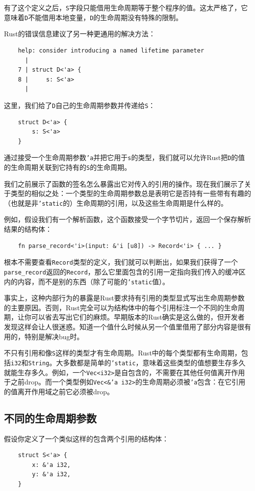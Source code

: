 有了这个定义之后，\texttt{S}字段只能借用生命周期等于整个程序的值。这太严格了，它意味着\texttt{D}不能借用本地变量，\texttt{D}的生命周期没有特殊的限制。

Rust的错误信息建议了另一种更通用的解决方法：
\begin{verbatim}
    help: consider introducing a named lifetime parameter
      |
    7 | struct D<'a> {
    8 |     s: S<'a>
      |
\end{verbatim}

这里，我们给了\texttt{D}自己的生命周期参数并传递给\texttt{S}：
\begin{verbatim}
    struct D<'a> {
        s: S<'a>
    }
\end{verbatim}

通过接受一个生命周期参数\texttt{'a}并把它用于\texttt{s}的类型，我们就可以允许Rust把\texttt{D}的值的生命周期关联到它持有的\texttt{S}的生命周期。

我们之前展示了函数的签名怎么暴露出它对传入的引用的操作。现在我们展示了关于类型的相似之处：一个类型的生命周期参数总是表明它是否持有一些带有有趣的（也就是非\texttt{'static}的）生命周期的引用，以及这些生命周期是什么样的。

例如，假设我们有一个解析函数，这个函数接受一个字节切片，返回一个保存解析结果的结构体：
\begin{verbatim}
    fn parse_record<'i>(input: &'i [u8]) -> Record<'i> { ... }
\end{verbatim}

根本不需要查看\texttt{Record}类型的定义，我们就可以判断出，如果我们获得了一个\\
\texttt{parse\_record}返回的\texttt{Record}，那么它里面包含的引用一定指向我们传入的缓冲区内的内容，而不是别的东西（除了可能的\texttt{'static}值）。

事实上，这种内部行为的暴露是Rust要求持有引用的类型显式写出生命周期参数的主要原因。否则，Rust完全可以为结构体中的每个引用标注一个不同的生命周期，让你可以省去写出它们的麻烦。早期版本的Rust确实是这么做的，但开发者发现这样会让人很迷惑。知道一个值什么时候从另一个值里借用了部分内容是很有用的，特别是解决bug时。

不只有引用和像\texttt{S}这样的类型才有生命周期。Rust中的每个类型都有生命周期，包括\texttt{i32}和\texttt{String}。大多数都是简单的\texttt{'static}，意味着这些类型的值想要生存多久就能生存多久。例如，一个\texttt{Vec<i32>}是自包含的，不需要在其他任何值离开作用于之前drop。而一个类型例如\texttt{Vec<\&'a i32>}的生命周期必须被\texttt{'a}包含：在它引用的值离开作用域之前它必须被drop。

\subsection{不同的生命周期参数}\label{DistLife}
假设你定义了一个类似这样的包含两个引用的结构体：
\begin{verbatim}
    struct S<'a> {
        x: &'a i32,
        y: &'a i32,
    }
\end{verbatim}

